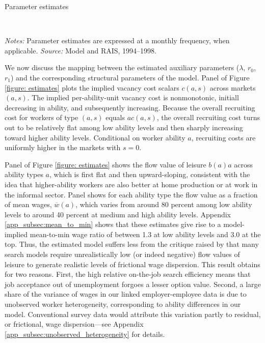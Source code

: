 \begin{table}[!htb]
  \centering
  \caption{Parameter estimates\label{table: estimates}}
  \resizebox{\textwidth}{!}{%
  }
  \\
  \posttabvspace
  \begin{minipage}[t]{1\columnwidth}%
    \begin{spacing}{0.75}
      \emph{\scriptsize{}Notes: }{\scriptsize{}Parameter estimates are expressed at a monthly frequency, when applicable. %
      \emph{\scriptsize{}Source: } Model and RAIS, 1994--1998.}
    \end{spacing}
  \end{minipage}
\end{table}


We now discuss the mapping between the estimated auxiliary parameters ($\lambda$, $r_0$, $r_1$) and the corresponding structural parameters of the model. Panel  of Figure \ref{figure: estimates} plots the implied vacancy cost scalars $c(a,s)$ across markets $(a,s)$. The implied per-ability-unit vacancy cost is nonmonotonic, initiall decreasing in ability, and subsequently increasing. %
Because the overall recruiting cost for workers of type $(a,s)$ equals $ac(a,s)$, the overall recruiting cost turns out to be relatively flat among low ability levels and then sharply increasing toward higher ability levels. Conditional on worker ability $a$, recruiting costs are uniformly higher in the markets with $s=0$.

Panel  of Figure \ref{figure: estimates} shows the flow value of leisure $b(a)a$ across ability types $a$, which is first flat and then upward-sloping, consistent with the idea that higher-ability workers are also better at home production or at work in the informal sector. Panel  shows for each ability type the flow value as a fraction of mean wages, $\overline{w}(a)$, which varies from around 80 percent among low ability levels to around 40 percent at medium and high ability levels. Appendix \ref{app_subsec:mean_to_min} shows that these estimates give rise to a model-implied mean-to-min wage ratio \citep{Hornstein2011} of between 1.3 at low ability levels and 3.0 at the top. Thus, the estimated model suffers less from the critique raised by \citet{Hornstein2011} that many search models require unrealistically low (or indeed negative) flow values of leisure to generate realistic levels of frictional wage dispersion. This result obtains for two reasons. First, the high relative on-the-job search efficiency means that job acceptance out of unemployment forgoes a lesser option value. Second, a large share of the variance of wages in our linked employer-employee data is due to unobserved worker heterogeneity, corresponding to ability differences in our model. Conventional survey data would attribute this variation partly to residual, or frictional, wage dispersion---see Appendix \ref{app_subsec:unobserved_heterogeneity} for details.


